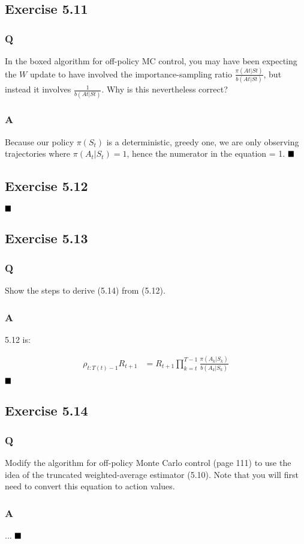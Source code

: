 \subsection{Exercise 5.11}
\subsubsection{Q}
In the boxed algorithm for off-policy MC control, you may have been expecting the $W$ update to have involved the importance-sampling ratio $\frac{\pi (At|St)}{b(At|St)}$, but
instead it involves $\frac{1}{b(At|St)}$. Why is this nevertheless correct?
\subsubsection{A}
Because our policy $\pi(S_t)$ is a deterministic, greedy one, we are only observing trajectories where $\pi(A_t | S_t) = 1$, hence the numerator in the equation = 1.
$
\hfill \blacksquare
$

\subsection{Exercise 5.12}
\ProgrammingExercise
$
\hfill \blacksquare
$

\subsection{Exercise 5.13}
\subsubsection{Q}
Show the steps to derive (5.14) from (5.12). 
\subsubsection{A}
5.12 is:

\begin{align}
\rho_{t:T(t)-1} R_{t+1} &= R_{t+1} \prod_{k = t}^{T-1} \frac{\pi(A_k | S_k)}{b(A_k | S_k)} \\
\end{align}
$
\hfill \blacksquare
$

\subsection{Exercise 5.14}
\subsubsection{Q}
Modify the algorithm for off-policy Monte Carlo control (page 111) to use the idea of the truncated weighted-average estimator (5.10). Note that you will first need to convert this equation to action values.
\subsubsection{A}
...
$
\hfill \blacksquare
$